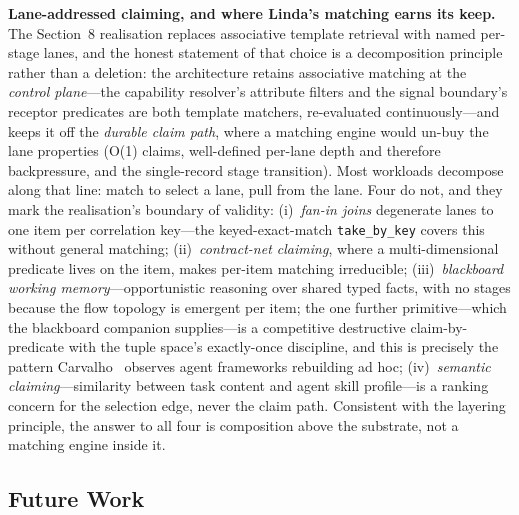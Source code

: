 \documentclass[11pt]{article}
\begin{document}
\textbf{Lane-addressed claiming, and where Linda's matching earns its keep.}
The Section~8 realisation replaces associative template retrieval with named
per-stage lanes, and the honest statement of that choice is a decomposition
principle rather than a deletion: the architecture retains associative matching
at the \emph{control plane}---the capability resolver's attribute filters and
the signal boundary's receptor predicates are both template matchers,
re-evaluated continuously---and keeps it off the \emph{durable claim path},
where a matching engine would un-buy the lane properties (O(1) claims,
well-defined per-lane depth and therefore backpressure, and the single-record
stage transition). Most workloads decompose along that line: match to select a
lane, pull from the lane. Four do not, and they mark the realisation's boundary
of validity: (i)~\emph{fan-in joins} degenerate lanes to one item per
correlation key---the keyed-exact-match \texttt{take\_by\_key} covers this without
general matching; (ii)~\emph{contract-net claiming}, where a multi-dimensional
predicate lives on the item, makes per-item matching irreducible;
(iii)~\emph{blackboard working memory}---opportunistic reasoning over shared
typed facts, with no stages because the flow topology is emergent per item; the
one further primitive---which the blackboard companion supplies---is a competitive destructive claim-by-predicate with the
tuple space's exactly-once discipline, and this is precisely the pattern
Carvalho~\cite{carvalho} observes agent frameworks rebuilding ad hoc;
(iv)~\emph{semantic claiming}---similarity between task content and agent
skill profile---is a ranking concern for the selection edge, never the claim
path. Consistent with the layering principle, the answer to all four is
composition above the substrate, not a matching engine inside it.

\subsection{Future Work}
\end{document}
